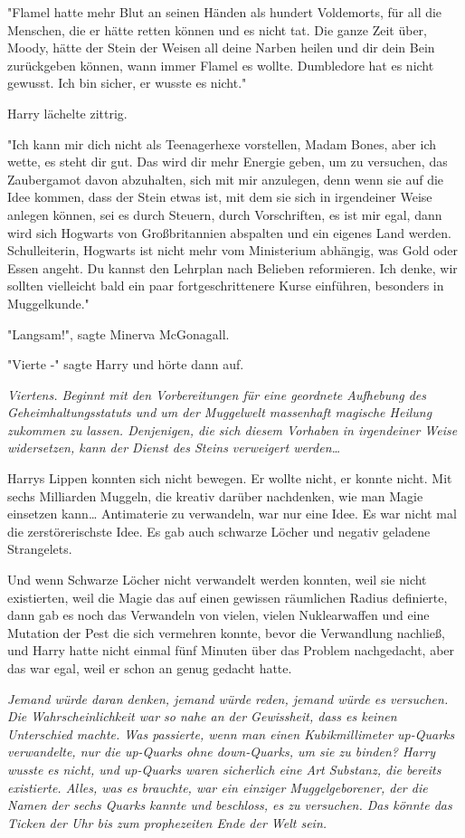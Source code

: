 {"Flamel hatte mehr Blut an seinen Händen als hundert Voldemorts, für all die Menschen, die er hätte retten können und es nicht tat. Die ganze Zeit über, Moody, hätte der Stein der Weisen all deine Narben heilen und dir dein Bein zurückgeben können, wann immer Flamel es wollte. Dumbledore hat es nicht gewusst. Ich bin sicher, er wusste es nicht."

Harry lächelte zittrig.

"Ich kann mir dich nicht als Teenagerhexe vorstellen, Madam Bones, aber ich wette, es steht dir gut. Das wird dir mehr Energie geben, um zu versuchen, das Zaubergamot davon abzuhalten, sich mit mir anzulegen, denn wenn sie auf die Idee kommen, dass der Stein etwas ist, mit dem sie sich in irgendeiner Weise anlegen können, sei es durch Steuern, durch Vorschriften, es ist mir egal, dann wird sich Hogwarts von Großbritannien abspalten und ein eigenes Land werden. Schulleiterin, Hogwarts ist nicht mehr vom Ministerium abhängig, was Gold oder Essen angeht. Du kannst den Lehrplan nach Belieben reformieren. Ich denke, wir sollten vielleicht bald ein paar fortgeschrittenere Kurse einführen, besonders in Muggelkunde."

"Langsam!", sagte Minerva McGonagall.

"Vierte -" sagte Harry und hörte dann auf.

\emph{Viertens. Beginnt mit den Vorbereitungen für eine geordnete Aufhebung des Geheimhaltungsstatuts und um der Muggelwelt massenhaft magische Heilung zukommen zu lassen. Denjenigen, die sich diesem Vorhaben in irgendeiner Weise widersetzen, kann der Dienst des Steins verweigert werden…}

Harrys Lippen konnten sich nicht bewegen. Er wollte nicht, er konnte nicht. Mit sechs Milliarden Muggeln, die kreativ darüber nachdenken, wie man Magie einsetzen kann… Antimaterie zu verwandeln, war nur eine Idee. Es war nicht mal die zerstörerischste Idee. Es gab auch schwarze Löcher und negativ geladene Strangelets.

Und wenn Schwarze Löcher nicht verwandelt werden konnten, weil sie nicht existierten, weil die Magie das auf einen gewissen räumlichen Radius definierte, dann gab es noch das Verwandeln von vielen, vielen Nuklearwaffen und eine Mutation der Pest die sich vermehren konnte, bevor die Verwandlung nachließ, und Harry hatte nicht einmal fünf Minuten über das Problem nachgedacht, aber das war egal, weil er schon an genug gedacht hatte.

\emph{Jemand würde daran denken, jemand würde reden, jemand würde es versuchen. Die Wahrscheinlichkeit war so nahe an der Gewissheit, dass es keinen Unterschied machte. Was passierte, wenn man einen Kubikmillimeter up-Quarks verwandelte, nur die up-Quarks ohne down-Quarks, um sie zu binden? Harry wusste es nicht, und up-Quarks waren sicherlich eine Art Substanz, die bereits existierte. Alles, was es brauchte, war ein einziger Muggelgeborener, der die Namen der sechs Quarks kannte und beschloss, es zu versuchen. Das könnte das Ticken der Uhr bis zum prophezeiten Ende der Welt sein.}

}
